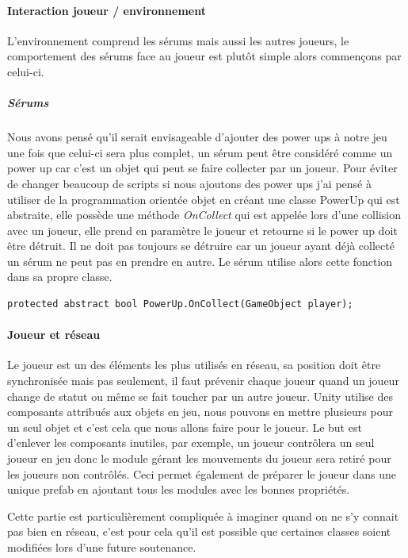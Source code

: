 \documentclass{article}
\begin{document}
\paragraph{Interaction joueur / environnement}

L'environnement comprend les sérums mais aussi les autres joueurs, le comportement des sérums face au joueur est plutôt simple alors commençons par celui-ci.

\subparagraph{Sérums}

Nous avons pensé qu'il serait envisageable d'ajouter des power ups à notre jeu une fois que celui-ci sera plus complet, un sérum peut être considéré comme un power up car c'est un objet qui peut se faire collecter par un joueur. Pour éviter de changer beaucoup de scripts si nous ajoutons des power ups j'ai pensé à utiliser de la programmation orientée objet en créant une classe PowerUp qui est abstraite, elle possède une méthode \emph{OnCollect} qui est appelée lors d'une collision avec un joueur, elle prend en paramètre le joueur et retourne si le power up doit être détruit. Il ne doit pas toujours se détruire car un joueur ayant déjà collecté un sérum ne peut pas en prendre en autre. Le sérum utilise alors cette fonction dans sa propre classe.


\begin{lstlisting}
protected abstract bool PowerUp.OnCollect(GameObject player);
\end{lstlisting}

\paragraph{Joueur et réseau}

Le joueur est un des éléments les plus utilisés en réseau, sa position doit être synchronisée mais pas seulement, il faut prévenir chaque joueur quand un joueur change de statut ou même se fait toucher par un autre joueur. Unity utilise des composants attribués aux objets en jeu, nous pouvons en mettre plusieurs pour un seul objet et c'est cela que nous allons faire pour le joueur. Le but est d'enlever les composants inutiles, par exemple, un joueur contrôlera un seul joueur en jeu donc le module gérant les mouvements du joueur sera retiré pour les joueurs non contrôlés. Ceci permet également de préparer le joueur dans une unique prefab en ajoutant tous les modules avec les bonnes propriétés.

Cette partie est particulièrement compliquée à imaginer quand on ne s'y connait pas bien en réseau, c'est pour cela qu'il est possible que certaines classes soient modifiées lors d'une future soutenance.
\end{document}
